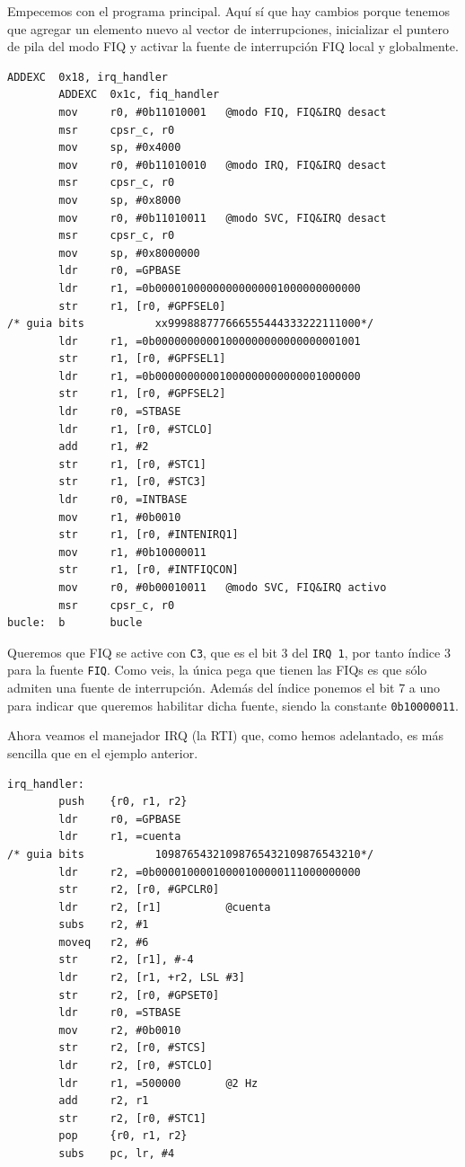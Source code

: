 Empecemos con el programa principal. Aquí sí que hay cambios porque tenemos que agregar un
elemento nuevo al vector de interrupciones, inicializar el puntero de pila del modo FIQ y activar
la fuente de interrupción FIQ local y globalmente.

\begin{lstlisting}[caption={Programa principal de inter5.s},label={lst:codigoPract5_5}]
        ADDEXC  0x18, irq_handler
        ADDEXC  0x1c, fiq_handler
        mov     r0, #0b11010001   @modo FIQ, FIQ&IRQ desact
        msr     cpsr_c, r0
        mov     sp, #0x4000
        mov     r0, #0b11010010   @modo IRQ, FIQ&IRQ desact
        msr     cpsr_c, r0
        mov     sp, #0x8000
        mov     r0, #0b11010011   @modo SVC, FIQ&IRQ desact
        msr     cpsr_c, r0
        mov     sp, #0x8000000
        ldr     r0, =GPBASE
        ldr     r1, =0b00001000000000000001000000000000
        str     r1, [r0, #GPFSEL0]
/* guia bits           xx999888777666555444333222111000*/
        ldr     r1, =0b00000000001000000000000000001001
        str     r1, [r0, #GPFSEL1]
        ldr     r1, =0b00000000001000000000000001000000
        str     r1, [r0, #GPFSEL2]
        ldr     r0, =STBASE
        ldr     r1, [r0, #STCLO]
        add     r1, #2
        str     r1, [r0, #STC1]
        str     r1, [r0, #STC3]
        ldr     r0, =INTBASE
        mov     r1, #0b0010
        str     r1, [r0, #INTENIRQ1]
        mov     r1, #0b10000011
        str     r1, [r0, #INTFIQCON]
        mov     r0, #0b00010011   @modo SVC, FIQ&IRQ activo
        msr     cpsr_c, r0
bucle:  b       bucle
\end{lstlisting}

Queremos que FIQ se active con {\tt C3}, que es el bit 3 del {\tt IRQ 1}, por tanto
índice 3 para la fuente {\tt FIQ}. Como veis, la única pega que tienen las FIQs es que
sólo admiten una fuente de interrupción. Además del índice ponemos el bit 7 a uno para
indicar que queremos habilitar dicha fuente, siendo la constante {\tt 0b10000011}.

Ahora veamos el manejador IRQ (la RTI) que, como hemos adelantado, es más sencilla que en el
ejemplo anterior.

\begin{lstlisting}
irq_handler:
        push    {r0, r1, r2}
        ldr     r0, =GPBASE
        ldr     r1, =cuenta
/* guia bits           10987654321098765432109876543210*/
        ldr     r2, =0b00001000010000100000111000000000
        str     r2, [r0, #GPCLR0]
        ldr     r2, [r1]          @cuenta
        subs    r2, #1
        moveq   r2, #6
        str     r2, [r1], #-4
        ldr     r2, [r1, +r2, LSL #3]
        str     r2, [r0, #GPSET0]
        ldr     r0, =STBASE
        mov     r2, #0b0010
        str     r2, [r0, #STCS]
        ldr     r2, [r0, #STCLO]
        ldr     r1, =500000       @2 Hz
        add     r2, r1
        str     r2, [r0, #STC1]
        pop     {r0, r1, r2}
        subs    pc, lr, #4
\end{lstlisting}

